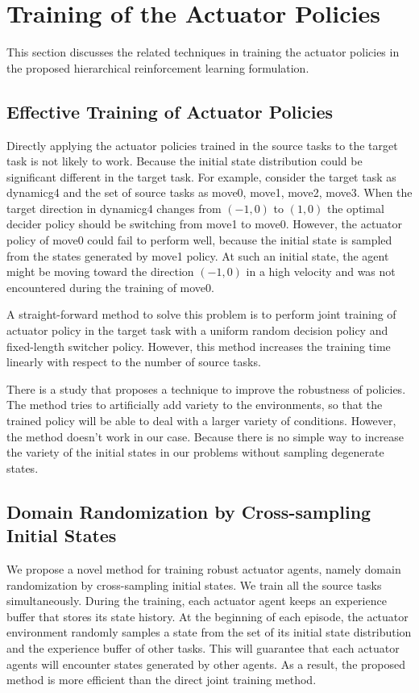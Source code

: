 \section{Training of the Actuator Policies}
This section discusses the related techniques in training the actuator policies in the proposed hierarchical reinforcement learning formulation.
\subsection{Effective Training of Actuator Policies}
Directly applying the actuator policies trained in the source tasks to the target task is not likely to work. Because the initial state distribution could be significant different in the target task.
For example, consider the target task as dynamicg4 and the set of source tasks as move0, move1, move2, move3. When the target direction in dynamicg4 changes from $(-1,0)$ to $(1,0)$ the optimal decider policy should be switching from move1 to move0. However, the actuator policy of move0 could fail to perform well, because the initial state is sampled from the states generated by move1 policy. At such an initial state, the agent might be moving toward the direction $(-1,0)$ in a high velocity and was not encountered during the training of move0.

A straight-forward method to solve this problem is to perform joint training of actuator policy in the target task with a uniform random decision policy and fixed-length switcher policy. However, this method increases the training time linearly with respect to the number of source tasks.

There is a study \cite{tobin2017domain} that proposes a technique to improve the robustness of policies. The method tries to artificially add variety to the environments, so that the trained policy will be able to deal with a larger variety of conditions. However, the method doesn't work in our case. Because there is no simple way to increase the variety of the initial states in our problems without sampling degenerate states. 

\subsection{Domain Randomization by Cross-sampling Initial States}
We propose a novel method for training robust actuator agents, namely domain randomization by cross-sampling initial states. We train all the source tasks simultaneously. During the training, each actuator agent keeps an experience buffer that stores its state history. At the beginning of each episode, the actuator environment randomly samples a state from the set of its initial state distribution and the experience buffer of other tasks. This will guarantee that each actuator agents will encounter states generated by other agents. As a result, the proposed method is more efficient than the direct joint training method.
